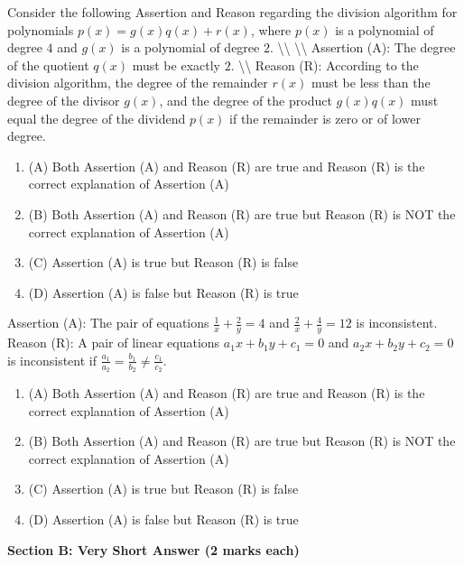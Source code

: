 \documentclass[12pt,a4paper]{exam}
\begin{document}
\begin{questions}
\question[1] Consider the following Assertion and Reason regarding the division algorithm for polynomials $p(x) = g(x)q(x) + r(x)$, where $p(x)$ is a polynomial of degree $4$ and $g(x)$ is a polynomial of degree $2$. \textbackslash{}\textbackslash{} \textbackslash{}\textbackslash{} Assertion (A): The degree of the quotient $q(x)$ must be exactly $2$. \textbackslash{}\textbackslash{} Reason (R): According to the division algorithm, the degree of the remainder $r(x)$ must be less than the degree of the divisor $g(x)$, and the degree of the product $g(x)q(x)$ must equal the degree of the dividend $p(x)$ if the remainder is zero or of lower degree.
\begin{enumerate}[label=(\Alph*)]
  \item (A) Both Assertion (A) and Reason (R) are true and Reason (R) is the correct explanation of Assertion (A)
  \item (B) Both Assertion (A) and Reason (R) are true but Reason (R) is NOT the correct explanation of Assertion (A)
  \item (C) Assertion (A) is true but Reason (R) is false
  \item (D) Assertion (A) is false but Reason (R) is true
\end{enumerate}
\vspace{0.15cm}

\question[1] Assertion (A): The pair of equations $\frac{1}{x} + \frac{2}{y} = 4$ and $\frac{2}{x} + \frac{4}{y} = 12$ is inconsistent. 
Reason (R): A pair of linear equations $a_1x + b_1y + c_1 = 0$ and $a_2x + b_2y + c_2 = 0$ is inconsistent if $\frac{a_1}{a_2} = \frac{b_1}{b_2} \neq \frac{c_1}{c_2}$.
\begin{enumerate}[label=(\Alph*)]
  \item (A) Both Assertion (A) and Reason (R) are true and Reason (R) is the correct explanation of Assertion (A)
  \item (B) Both Assertion (A) and Reason (R) are true but Reason (R) is NOT the correct explanation of Assertion (A)
  \item (C) Assertion (A) is true but Reason (R) is false
  \item (D) Assertion (A) is false but Reason (R) is true
\end{enumerate}
\vspace{0.15cm}

\end{questions}
\bigskip
\noindent\textbf{\large Section B: Very Short Answer (2 marks each)}
\end{document}
